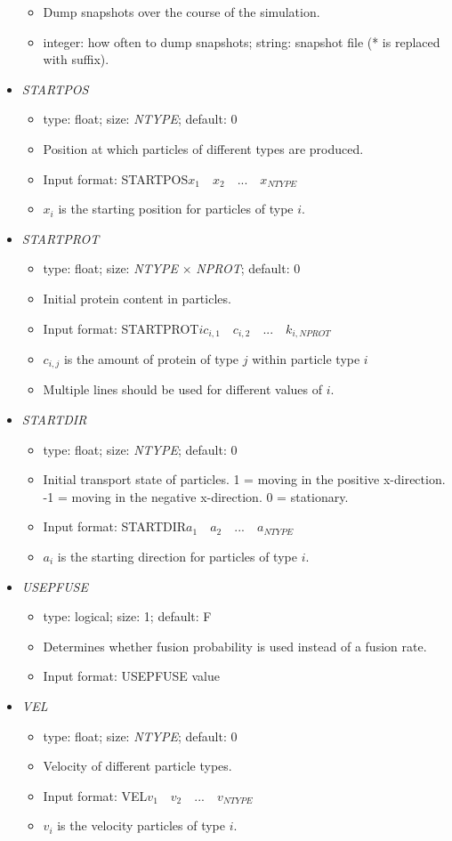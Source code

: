 \documentclass[12pt]{article}
\begin{document}
\begin{itemize}
\begin{itemize}
    \item Dump snapshots over the course of the simulation.
    \item integer: how often to dump snapshots; string: snapshot file (* is replaced with suffix).
   \end{itemize}
%
\item {\it STARTPOS}
\begin{itemize}
	\item  type: float; size: \textit{NTYPE}; default: 0
	\item Position at which particles of different types are produced.
	\item Input format: STARTPOS\quad$x_{1}\quad x_{2}\quad...\quad x_{NTYPE}$
	\item $x_{i}$ is the starting position for particles of type $i$.
\end{itemize}
%
\item {\it STARTPROT}
\begin{itemize}
	\item  type: float; size: \textit{NTYPE} $\times$ \textit{NPROT}; default: 0
	\item Initial protein content in particles.
	\item Input format: STARTPROT\quad$i$\quad$c_{i,1}\quad c_{i,2}\quad...\quad k_{i,NPROT}$
	\item $c_{i,j}$ is the amount of protein of type $j$ within particle type $i$
	\item Multiple lines should be used for different values of $i$.
\end{itemize}
%
\item {\it STARTDIR}
\begin{itemize}
	\item  type: float; size: \textit{NTYPE}; default: 0
	\item Initial transport state of particles. 1 = moving in the positive x-direction. -1 = moving in the negative x-direction. 0 = stationary.
	\item Input format: STARTDIR\quad$a_{1}\quad a_{2}\quad...\quad a_{NTYPE}$
	\item $a_{i}$ is the starting direction for particles of type $i$.
\end{itemize}
%
\item {\it USEPFUSE}
\begin{itemize}
	\item  type: logical; size: 1; default: F
	\item Determines whether fusion probability is used instead of a fusion rate.
	\item Input format: USEPFUSE value
\end{itemize}	
%
\item {\it VEL}
\begin{itemize}
	\item  type: float; size: \textit{NTYPE}; default: 0
	\item Velocity of different particle types.
	\item Input format: VEL\quad$v_{1}\quad v_{2}\quad...\quad v_{NTYPE}$
	\item $v_{i}$ is the velocity particles of type $i$.
\end{itemize}


\end{itemize}
\end{document}
